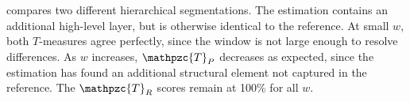 \documentclass{article}
\def\shag{\ensuremath{\mathpzc{T}}}
\begin{document}

 compares two different hierarchical segmentations.
The estimation contains an additional high-level layer, but is otherwise identical to the reference.
At small $w$, both $T$-measures agree perfectly, since the window
is not large enough to resolve differences.
As $w$ increases, $\shag_P$ decreases as expected, since the
estimation has found an additional structural element not captured in the reference.
The $\shag_R$ scores remain at 100\% for all $w$.
\end{document}
